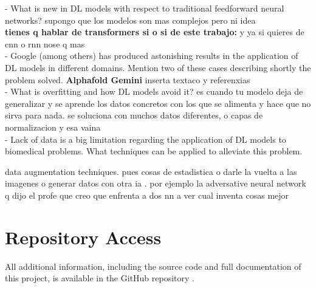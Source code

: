 \documentclass{article}
\begin{document}
- What is new in DL models with respect to traditional feedforward neural networks? supongo que los modelos son mas complejos pero ni idea\\

\textbf{
tienes q hablar de transformers si o si de este trabajo:\cite{vaswani2017attention}
}
y ya si quieres de cnn o rnn nose q mas\\

- Google (among others) has produced astonishing results in the 
application of DL models in different domains. Mention two of these cases describing shortly the problem solved. \textbf{Alphafold Gemini} inserta textaco y referenxias\\

- What is overfitting and how DL models avoid it? es cuando tu modelo deja de generalizar y se aprende los datos concretos con los que se alimenta y hace que no sirva para nada. se soluciona con muchos datos diferentes, o capas de normalizacion y esa vaina\\

- Lack of data is a big limitation regarding the application of DL 
models to biomedical problems. What techniques can be applied 
to alleviate this problem.

data augmentation techniques. pues cosas de estadistica o darle la vuelta a las imagenes o generar datos con otra ia . por ejemplo la adversative neural network q dijo el profe que creo que enfrenta a dos nn a ver cual inventa cosas mejor



\section{Repository Access}

All additional information, including the source code and full documentation of this project, is available in the GitHub repository \cite{cuevas2024github}.


\end{document}
